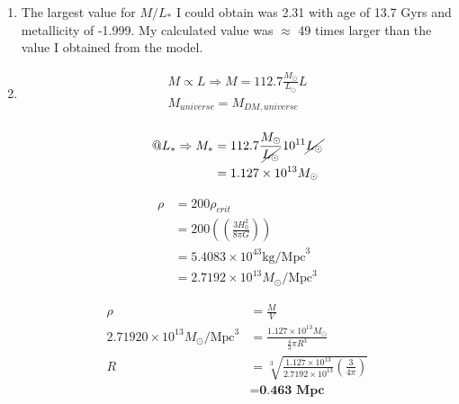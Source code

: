 \documentclass[10pt,letterpaper]{article}
\begin{document}
\begin{enumerate}
\begin{enumerate}
\item The largest value for $M/L_*$ I could obtain was 2.31 with age of 13.7 Gyrs and metallicity of -1.999. My calculated value was $\approx$ 49 times larger than the value I obtained from the model.\\

\item 
\begin{equation}\nonumber
\begin{split}
M \propto L \Rightarrow M = 112.7 \frac{M_\odot}{L_\odot} L\\
M_{universe} = M_{DM, universe}\\
\end{split}
\end{equation}
\begin{center}
\end{center}

\newpage

\begin{equation}\nonumber
\begin{split}
@ L_* \Rightarrow M_* & = 112.7 \frac{M_\odot}{\cancel{L_\odot}} 10^{11}\cancel{L_\odot}\\
 & = 1.127 \times 10^{13} M_\odot
\end{split}
\end{equation}

\begin{equation}\nonumber
\begin{split}
\rho & = 200\rho_{crit}\\
 & = 200(\left(\frac{3 H_0^2}{8 \pi G}\right))\\
 & = 5.4083 \times 10^{43} \text{kg/Mpc}^3\\
 & = 2.7192 \times 10^{13} M_\odot/\text{Mpc}^3
\end{split}
\end{equation}

\begin{equation}\nonumber
\begin{split}
\rho & = \frac{M}{V}\\
2.71920\times10^{13}M_\odot/\text{Mpc}^3 & = \frac{1.127\times10^{13}M_\odot}{\frac{4}{3} \pi R^3}\\
R & = \sqrt[3]{\frac{1.127\times10^{13}}{2.7192 \times10^{13}}\left(\frac{3}{4\pi}\right)}\\
 & = \textbf{0.463 Mpc}\\
\end{split}
\end{equation}


\end{enumerate}
\end{enumerate}
\end{document}
